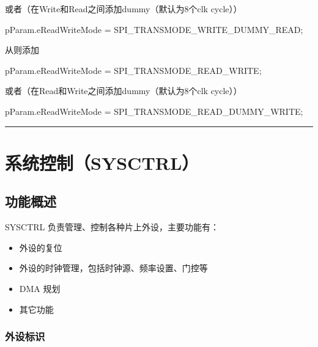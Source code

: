 \documentclass[
  12pt,
]{book}
\newenvironment{Shaded}{\begin{snugshade}}{\end{snugshade}}
\newcommand{\NormalTok}[1]{#1}
\providecommand{\tightlist}{%
  \setlength{\itemsep}{0pt}\setlength{\parskip}{0pt}}
\begin{document}
或者（在Write和Read之间添加dummy（默认为8个clk cycle））

\begin{Shaded}
\begin{Highlighting}[]
\NormalTok{    pParam.eReadWriteMode = SPI_TRANSMODE_WRITE_DUMMY_READ;}
\end{Highlighting}
\end{Shaded}

从则添加

\begin{Shaded}
\begin{Highlighting}[]
\NormalTok{    pParam.eReadWriteMode = SPI_TRANSMODE_READ_WRITE;}
\end{Highlighting}
\end{Shaded}

或者（在Read和Write之间添加dummy（默认为8个clk cycle））

\begin{Shaded}
\begin{Highlighting}[]
\NormalTok{    pParam.eReadWriteMode = SPI_TRANSMODE_READ_DUMMY_WRITE;}
\end{Highlighting}
\end{Shaded}

\begin{center}\rule{0.5\linewidth}{0.5pt}\end{center}

\hypertarget{ch-sysctrl}{%
\chapter{系统控制（SYSCTRL）}\label{ch-sysctrl}}

\hypertarget{ux529fux80fdux6982ux8ff0-5}{%
\section{功能概述}\label{ux529fux80fdux6982ux8ff0-5}}

SYSCTRL 负责管理、控制各种片上外设，主要功能有：

\begin{itemize}
\tightlist
\item
  外设的复位
\item
  外设的时钟管理，包括时钟源、频率设置、门控等
\item
  DMA 规划
\item
  其它功能
\end{itemize}

\hypertarget{ux5916ux8bbeux6807ux8bc6}{%
\subsection{外设标识}\label{ux5916ux8bbeux6807ux8bc6}}
\end{document}
